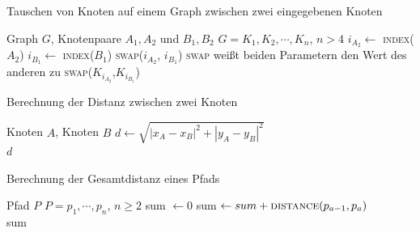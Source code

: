 \begin{algorithm}
    \caption{Tauschen von Knoten auf einem Graph zwischen zwei eingegebenen Knoten}
    \label{alg:swap-nodes-inbetween}
    \begin{algorithmic}[1]
        \Require Graph $G$, Knotenpaare $A_1,A_2$ und $B_1,B_2$
        \Require $G=K_1,K_2,\cdots,K_n$, $n>4$
        \State $i_{A_2} \gets$ \textsc{index}($A_2$)
        \State $i_{B_1} \gets$ \textsc{index}($B_1$)
            \State \textsc{swap}($i_{A_2}$, $i_{B_1}$) 
            \Comment \textsc{swap} weißt beiden Parametern den Wert des anderen zu
        \EndIf
            \State \textsc{swap}($K_{i_{A_2}}$,$K_{i_{B_1}}$)
        \EndWhile
    \end{algorithmic}
\end{algorithm}

\begin{algorithm}
    \caption{Berechnung der Distanz zwischen zwei Knoten}
    \label{alg:calc-distance-two-nodes}
    \begin{algorithmic}[1]
        \Require Knoten $A$, Knoten $B$
        \State $d \gets \sqrt{|x_A - x_B|^2 + |y_A - y_B|^2}$\\
        \Return $d$
    \end{algorithmic}
\end{algorithm}

\begin{algorithm}
    \caption{Berechnung der Gesamtdistanz eines Pfads}
    \label{alg:calc-total-distance}
    \begin{algorithmic}[1]
        \Require Pfad $P$
        \Require $P=p_1,\cdots,p_n$, $n \geq 2$
        \State sum $\gets 0$
            \State sum $\gets sum + \textrm{\textsc{distance}}(p_{a-1}, p_a)$
        \EndFor\\
        \Return sum
    \end{algorithmic}
\end{algorithm}
